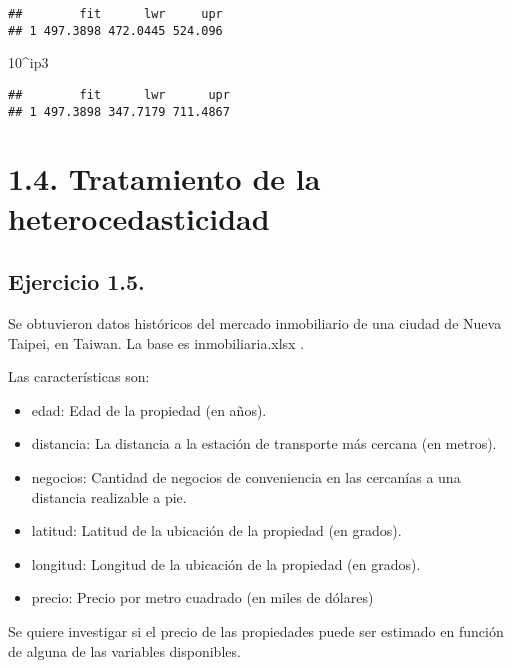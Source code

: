 \documentclass[
]{article}
\newenvironment{Shaded}{\begin{snugshade}}{\end{snugshade}}
\newcommand{\DecValTok}[1]{\textcolor[rgb]{0.00,0.00,0.81}{#1}}
\newcommand{\NormalTok}[1]{#1}
\newcommand{\SpecialCharTok}[1]{\textcolor[rgb]{0.00,0.00,0.00}{#1}}
\providecommand{\tightlist}{%
  \setlength{\itemsep}{0pt}\setlength{\parskip}{0pt}}
\begin{document}
\begin{verbatim}
##        fit      lwr     upr
## 1 497.3898 472.0445 524.096
\end{verbatim}

\begin{Shaded}
\begin{Highlighting}[]
\DecValTok{10}\SpecialCharTok{\^{}}\NormalTok{ip3}
\end{Highlighting}
\end{Shaded}

\begin{verbatim}
##        fit      lwr      upr
## 1 497.3898 347.7179 711.4867
\end{verbatim}

\hypertarget{tratamiento-de-la-heterocedasticidad}{%
\section{\texorpdfstring{{1.4. Tratamiento de la
heterocedasticidad}}{1.4. Tratamiento de la heterocedasticidad}}\label{tratamiento-de-la-heterocedasticidad}}

\hypertarget{ejercicio-1.5.}{%
\subsection{Ejercicio 1.5.}\label{ejercicio-1.5.}}

Se obtuvieron datos históricos del mercado inmobiliario de una ciudad de
Nueva Taipei, en Taiwan. La base es inmobiliaria.xlsx .

Las características son:

\begin{itemize}
\tightlist
\item
  edad: Edad de la propiedad (en años).
\item
  distancia: La distancia a la estación de transporte más cercana (en
  metros).
\item
  negocios: Cantidad de negocios de conveniencia en las cercanías a una
  distancia realizable a pie.
\item
  latitud: Latitud de la ubicación de la propiedad (en grados).
\item
  longitud: Longitud de la ubicación de la propiedad (en grados).
\item
  precio: Precio por metro cuadrado (en miles de dólares)
\end{itemize}

Se quiere investigar si el precio de las propiedades puede ser estimado
en función de alguna de las variables disponibles.
\end{document}

